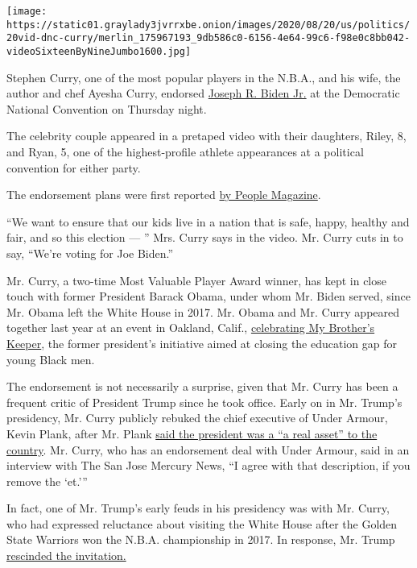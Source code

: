 \texttt{[image: https://static01.graylady3jvrrxbe.onion/images/2020/08/20/us/politics/20vid-dnc-curry/merlin\_175967193\_9db586c0-6156-4e64-99c6-f98e0c8bb042-videoSixteenByNineJumbo1600.jpg]}

Stephen Curry, one of the most popular players in the N.B.A., and his
wife, the author and chef Ayesha Curry, endorsed
\href{https://www.nytimes3xbfgragh.onion/interactive/2020/us/elections/joe-biden.html}{Joseph
R. Biden Jr.} at the Democratic National Convention on Thursday night.

The celebrity couple appeared in a pretaped video with their daughters,
Riley, 8, and Ryan, 5, one of the highest-profile athlete appearances at
a political convention for either party.

The endorsement plans were first reported
\href{https://people.com/politics/steph-and-ayesha-curry-endorse-joe-biden/}{by
People Magazine}.

``We want to ensure that our kids live in a nation that is safe, happy,
healthy and fair, and so this election --- '' Mrs. Curry says in the
video. Mr. Curry cuts in to say, ``We're voting for Joe Biden.''

Mr. Curry, a two-time Most Valuable Player Award winner, has kept in
close touch with former President Barack Obama, under whom Mr. Biden
served, since Mr. Obama left the White House in 2017. Mr. Obama and Mr.
Curry appeared together last year at an event in Oakland, Calif.,
\href{https://theundefeated.com/features/obama-and-curry-join-together-for-my-brothers-keeper-alliance/}{celebrating
My Brother's Keeper}, the former president's initiative aimed at closing
the education gap for young Black men.

The endorsement is not necessarily a surprise, given that Mr. Curry has
been a frequent critic of President Trump since he took office. Early on
in Mr. Trump's presidency, Mr. Curry publicly rebuked the chief
executive of Under Armour, Kevin Plank, after Mr. Plank
\href{https://www.nytimes3xbfgragh.onion/2017/02/08/sports/basketball/stephen-curry-under-armour-donald-trump-warriors.html\#:~:text=Stephen\%20Curry\%20became\%20the\%20latest,real\%20asset\%E2\%80\%9D\%20to\%20the\%20country.}{said
the president was a ``a real asset'' to the country}. Mr. Curry, who has
an endorsement deal with Under Armour, said in an interview with The San
Jose Mercury News, ``I agree with that description, if you remove the
`et.'''

In fact, one of Mr. Trump's early feuds in his presidency was with Mr.
Curry, who had expressed reluctance about visiting the White House after
the Golden State Warriors won the N.B.A. championship in 2017. In
response, Mr. Trump
\href{https://www.nytimes3xbfgragh.onion/2017/09/23/sports/stephen-curry-trump-nba-.html}{rescinded
the invitation.}

